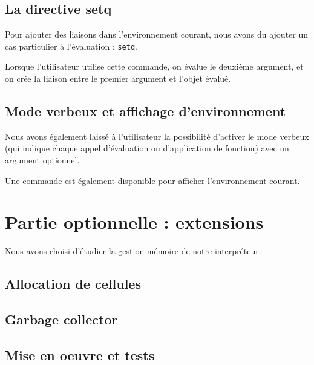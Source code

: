 \documentclass[12pt]{article}
\begin{document}
\subsection{La directive setq}

Pour ajouter des liaisons dans l'environnement courant, nous avons du ajouter un cas particulier à l'évaluation : \texttt{setq}. 

Lorsque l'utilisateur utilise cette commande, on évalue le deuxième argument, et on crée la liaison entre le premier argument et l'objet évalué.


\subsection{Mode verbeux et affichage d'environnement}

Nous avons également laissé à l'utilisateur la possibilité d'activer le mode verbeux (qui indique chaque appel d'évaluation ou d'application de fonction) avec un argument optionnel.

Une commande est également disponible pour afficher l'environnement courant.


\section{Partie optionnelle : extensions}

Nous avons choisi d'étudier la gestion mémoire de notre interpréteur.

\subsection{Allocation de cellules}

\subsection{Garbage collector}

\subsection{Mise en oeuvre et tests}
\end{document}

